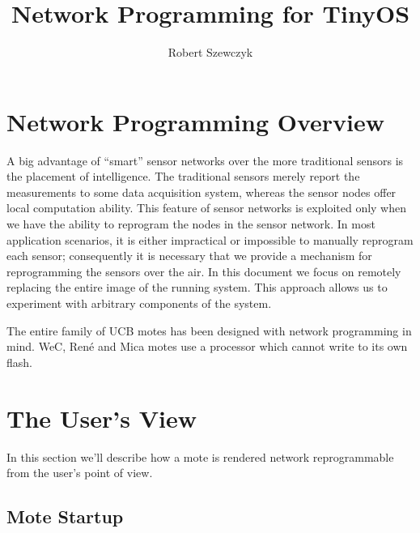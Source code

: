 \documentclass[12pt,fullpage]{article}
\title{Network Programming for TinyOS}
\author{Robert Szewczyk}
\newcommand{\rene}{ Ren{\'e}\xspace}
\newcommand{\wec}{ WeC\xspace}
\newcommand{\mica}{ Mica\xspace}
\begin{document}
\maketitle




\section*{Network Programming Overview}

A big advantage of ``smart'' sensor networks over the more traditional sensors
is the placement of intelligence.  The traditional sensors merely report the
measurements to some data acquisition system, whereas the sensor nodes offer
local computation ability.  This feature of sensor networks is exploited only
when we have the ability to reprogram the nodes in the sensor network.  In
most application scenarios, it is either impractical or impossible to manually
reprogram each sensor; consequently it is necessary that we provide a
mechanism for reprogramming the sensors over the air.  In this document we
focus on remotely replacing the entire image of the running system.  This
approach allows us to experiment with arbitrary components of the system. 

The entire family of UCB motes has been designed with network programming in
mind.  \wec, \rene and \mica motes use a processor which cannot write to its
own flash. 

\section*{The User's View}

In this section we'll describe how a mote is rendered network reprogrammable
from the user's point of view. 

\subsection*{Mote Startup}
\end{document}
